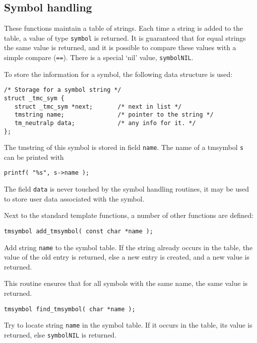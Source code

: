 \subsection{Symbol handling}
\label{s.tmsymbol}
These functions maintain a table of strings.
Each time a string is added to the table,
a value of type {\tt symbol} is returned.
It is guaranteed that for equal strings the same value is returned,
and it is possible to compare these values with a simple compare ({\tt ==}).
There is a special `nil' value, {\tt symbolNIL}.
\par
To store the information for a symbol, the following data structure is used:
\begin{verbatim}
/* Storage for a symbol string */
struct _tmc_sym {
   struct _tmc_sym *next;       /* next in list */
   tmstring name;               /* pointer to the string */
   tm_neutralp data;            /* any info for it. */
};
\end{verbatim}
The tmstring of this symbol is stored in field \verb+name+.
The name of a tmsymbol \verb+s+ can be printed with
\begin{showfile}
\begin{verbatim}
printf( "%s", s->name );
\end{verbatim}
\end{showfile}
The field \verb+data+ is never touched by the symbol handling routines,
it may be used to store user data associated with the symbol.
\par
Next to the standard template functions, a number of other functions
are defined:
\begin{verbatim}
tmsymbol add_tmsymbol( const char *name );
\end{verbatim}
\begin{desc}
Add string {\tt name} to the symbol table.
If the string already occurs in the table, the value of the old
entry is returned, else a new entry is created,
and a new value is returned.
\par
This routine ensures that for all symbols with the same name,
the same value is returned.
\end{desc}
\begin{verbatim}
tmsymbol find_tmsymbol( char *name );
\end{verbatim}
\begin{desc}
Try to locate string {\tt name} in the symbol table.
If it occurs in the table, its value is returned,
else {\tt symbolNIL} is returned.
\end{desc}
